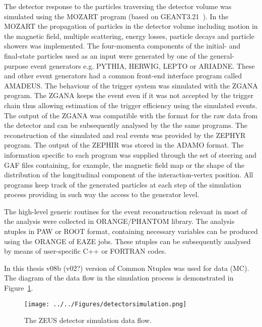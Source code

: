 The detector response to the particles traversing the detector volume was simulated using the MOZART program (based on GEANT3.21~\cite{tech:cern-dd-ee-84-1}). In the MOZART the propagation of particles in the detector volume including motion in the magnetic field, multiple scattering, energy losses, particle decays and particle showers was implemented. The four-momenta components of the initial- and final-state particles used as an input were generated by one of the general-purpose event generators e.g. PYTHIA, HERWIG, LEPTO or ARIADNE. These and other event generators had a common front-end interface program called AMADEUS. The behaviour of the trigger system was simulated with the ZGANA program. The ZGANA keeps the event even if it was not accepted by the trigger chain thus allowing estimation of the trigger efficiency using the simulated events. The output of the ZGANA was compatible with the format for the raw data from the detector and can be subsequently analysed by the the same programs. The reconstruction of the simulated and real events was provided by the ZEPHYR program. The output of the ZEPHIR was stored in the ADAMO format. The information specific to each program was supplied through the set of steering and GAF files containing, for example, the magnetic field map or the shape of the distribution of the longitudinal component of the interaction-vertex position. All programs keep track of the generated particles at each step of the simulation process providing in such way the access to the generator level.

The high-level generic routines for the event reconstruction relevant in most of the analysis were collected in ORANGE/PHANTOM library. The analysis ntuples in PAW or ROOT format, containing necessary variables can be produced using the ORANGE of EAZE jobs. These ntuples can be subsequently analysed by means of user-specific C++ or FORTRAN codes. 

In this thesis v08b (v02?) version of Common Ntuples was used for data (MC). The diagram of the data flow in the simulation process is demonstrated in Figure~\ref{fig:detectorsimulation}.

\begin{figure}[p]
	\centering
		\texttt{[image: ../../Figures/detectorsimulation.png]}
	\caption{The ZEUS detector simulation data flow.}
	\label{fig:detectorsimulation}
\end{figure}

